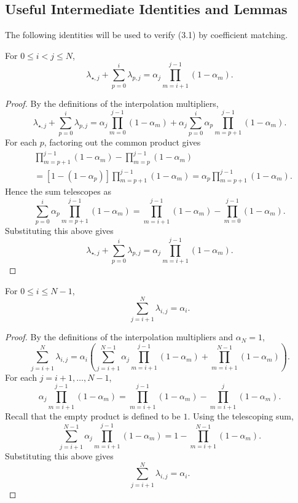 \documentclass[11pt, hidelinks]{article}
\begin{document}
\subsection{Useful Intermediate Identities and Lemmas}
The following identities will be used to verify (3.1) by coefficient matching.
\begin{lemma}\label{lem:lambda-partial-sum}
For $0\le i<j\le N$,
\[ \lambda_{\star,j}+\sum_{p=0}^{i}\lambda_{p,j} =\alpha_j\prod_{m=i+1}^{j-1}(1-\alpha_m). \]
\end{lemma}
\begin{proof}
By the definitions of the interpolation multipliers,
\[\lambda_{\star,j}+\sum_{p=0}^{i}\lambda_{p,j}
=\alpha_j\prod_{m=0}^{j-1}(1-\alpha_m)
+\alpha_j\sum_{p=0}^{i}\alpha_p\prod_{m=p+1}^{j-1}(1-\alpha_m).\]
For each $p$, factoring out the common product gives
\[\begin{aligned}
&\prod_{m=p+1}^{j-1}(1-\alpha_m)-\prod_{m=p}^{j-1}(1-\alpha_m)\\
&=[1-(1-\alpha_p)]\prod_{m=p+1}^{j-1}(1-\alpha_m)
=\alpha_p\prod_{m=p+1}^{j-1}(1-\alpha_m).
\end{aligned} \]
Hence the sum telescopes as
\[\sum_{p=0}^{i}\alpha_p\prod_{m=p+1}^{j-1}(1-\alpha_m)
=\prod_{m=i+1}^{j-1}(1-\alpha_m)-\prod_{m=0}^{j-1}(1-\alpha_m).\]
Substituting this above gives
\[\lambda_{\star,j}+\sum_{p=0}^{i}\lambda_{p,j} =\alpha_j\prod_{m=i+1}^{j-1}(1-\alpha_m). \]
\end{proof}
\begin{lemma}\label{lem:lambda-outgoing-sum}
For $0\le i\le N-1$,
\[\sum_{j=i+1}^{N}\lambda_{i,j}=\alpha_i.\]
\end{lemma}
\begin{proof}
By the definitions of the interpolation multipliers and $\alpha_N=1$,
\[ \sum_{j=i+1}^{N}\lambda_{i,j}
=\alpha_i\left(\sum_{j=i+1}^{N-1}\alpha_j\prod_{m=i+1}^{j-1}(1-\alpha_m)
+\prod_{m=i+1}^{N-1}(1-\alpha_m)\right). \]
For each $j=i+1,\ldots,N-1$,
\[ \alpha_j\prod_{m=i+1}^{j-1}(1-\alpha_m)
=\prod_{m=i+1}^{j-1}(1-\alpha_m)-\prod_{m=i+1}^{j}(1-\alpha_m). \]
Recall that the empty product is defined to be $1$. Using the telescoping sum, \[ \sum_{j=i+1}^{N-1}\alpha_j\prod_{m=i+1}^{j-1}(1-\alpha_m)
=1-\prod_{m=i+1}^{N-1}(1-\alpha_m). \]
Substituting this above gives
\[ \sum_{j=i+1}^{N}\lambda_{i,j}=\alpha_i. \]
\end{proof}
\end{document}

